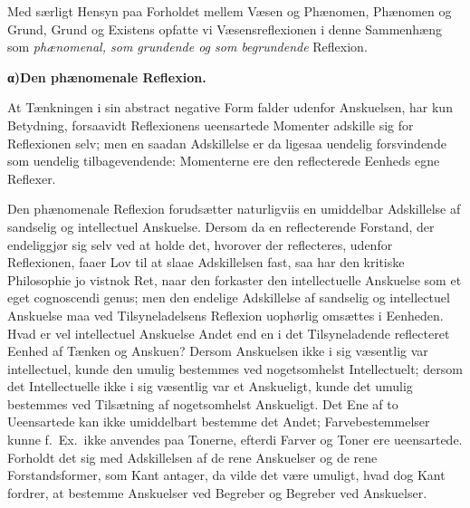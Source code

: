 \documentclass[12pt]{book}
\newcommand{\opage}[1]{\marginnote{\footnotesize\textit{[#1]}}}
\begin{document}
Med særligt Hensyn paa Forholdet mellem Væsen og Phænomen, Phænomen og Grund, Grund
og Existens opfatte vi Væsensreflexionen i denne Sammenhæng som \emph{phænomenal, som
grundende og som begrundende} Reflexion.

\begin{center}{\bfseries α)\quad Den phænomenale Reflexion.}\end{center}

At Tænkningen i sin abstract negative Form falder udenfor Anskuelsen, har kun
Betydning, forsaavidt Reflexionens ueensartede Momenter adskille sig for Reflexionen
\opage{78} selv; men en saadan Adskillelse er da ligesaa uendelig forsvindende som uendelig
tilbagevendende: Momenterne ere den reflecterede Eenheds egne Reflexer.

Den phænomenale Reflexion forudsætter naturligviis en umiddelbar Adskillelse af
sandselig og intellectuel Anskuelse. Dersom da en reflecterende Forstand, der
endeliggjør sig selv ved at holde det, hvorover der reflecteres, udenfor Reflexionen,
faaer Lov til at slaae Adskillelsen fast, saa har den kritiske Philosophie jo vistnok
Ret, naar den forkaster den intellectuelle Anskuelse som et eget cognoscendi genus;
men den endelige Adskillelse af sandselig og intellectuel Anskuelse maa ved
Tilsyneladelsens Reflexion uophørlig omsættes i Eenheden. Hvad er vel intellectuel
Anskuelse Andet end en i det Tilsyneladende reflecteret Eenhed af Tænken og Anskuen?
Dersom Anskuelsen ikke i sig væsentlig var intellectuel, kunde den umulig bestemmes
ved nogetsomhelst Intellectuelt; dersom det Intellectuelle ikke i sig væsentlig var
et Anskueligt, kunde det umulig bestemmes ved Tilsætning af nogetsomhelst Anskueligt.
Det Ene af to Ueensartede kan ikke umiddelbart bestemme det Andet; Farvebestemmelser
kunne f.\ Ex.\ ikke anvendes paa Tonerne, efterdi Farver og Toner ere ueensartede.
Forholdt det sig med Adskillelsen af de rene Anskuelser og de rene Forstandsformer,
som Kant antager, da vilde det være umuligt, hvad dog Kant fordrer, at bestemme
Anskuelser ved Begreber og Begreber ved Anskuelser.
\end{document}
